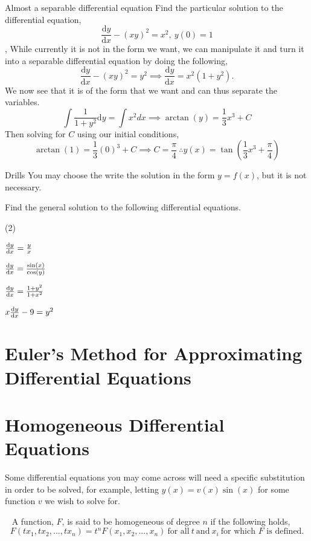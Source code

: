\begin{example}{Almost a separable differential equation}
Find the particular solution to the differential equation,
$$\frac{\mathrm{d}y}{\mathrm{d}x}-(xy)^2=x^2, \ y(0)=1$$
\sep
While currently it is not in the form we want, we can manipulate it and turn it into a separable differential equation by doing the following,
$$\frac{\mathrm{d}y}{\mathrm{d}x}-(xy)^2=y^2 \implies \frac{\mathrm{d}y}{\mathrm{d}x}=x^2(1+y^2).$$
We now see that it is of the form that we want and can thus separate the variables.
$$\int \frac{1}{1+y^2}\mathrm{d}y=\int x^2dx \implies \arctan(y)=\frac{1}{3}x^3+C$$
Then solving for $C$ using our initial conditions,
$$\arctan(1)=\frac{1}{3}(0)^3+C \implies C=\frac{\pi}{4} \ \therefore y(x)=\tan\left(\frac{1}{3}x^3+\frac{\pi}{4}\right)$$
\end{example}
\begin{questions}{Drills}
You may choose the write the solution in the form $y=f(x)$, but it is not necessary.

\vspace{5pt}
Find the general solution to the following differential equations.
\vspace{5pt}
\begin{question_set}(2)
\item $\dv{y}{x}=\frac{y}{x}$
\item $\dv{y}{x}=\frac{\sin(x)}{\cos(y)}$ \\
\item $\dv{y}{x}=\frac{1+y^2}{1+x^2}$
\item $x\dv{y}{x}-9=y^2$
\end{question_set}
\smallskip
\end{questions}

\section{Euler's Method for Approximating Differential Equations}



\section{Homogeneous Differential Equations}
Some differential equations you may come across will need a specific substitution in order to be solved, for example, letting $y(x)=v(x)\sin(x)$ for some function $v$ we wish to solve for.
\begin{definition}{~}
A function, $F$, is said to be homogeneous of degree $n$ if the following holds,
$$F(tx_1,tx_2,...,tx_n)=t^nF(x_1,x_2,...,x_n) \ \text{for all} \ t \ \text{and} \ x_i \ \text{for which $F$ is defined.}$$
\end{definition}


